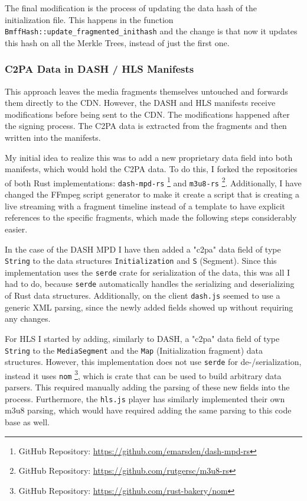 The final modification is the process of updating the data hash of the initialization file. This happens in the function \texttt{BmffHash::update\_fragmented\_inithash} and the change is that now it updates this hash on all the Merkle Trees, instead of just the first one.

\subsubsection{C2PA Data in DASH / HLS Manifests\label{sec:in_manifest}}

This approach leaves the media fragments themselves untouched and forwards them directly to the CDN. However, the DASH and HLS manifests receive modifications before being sent to the CDN. The modifications happened after the signing process. The C2PA data is extracted from the fragments and then written into the manifests.

My initial idea to realize this was to add a new proprietary data field into both manifests, which would hold the C2PA data. To do this, I forked the repositories of both Rust implementations: \texttt{dash-mpd-rs} \footnote{GitHub Repository: \url{https://github.com/emarsden/dash-mpd-rs}} and \texttt{m3u8-rs} \footnote{GitHub Repository: \url{https://github.com/rutgersc/m3u8-rs}}. Additionally, I have changed the FFmpeg script generator to make it create a script that is creating a live streaming with a fragment timeline instead of a template to have explicit references to the specific fragments, which made the following steps considerably easier.

In the case of the DASH MPD I have then added a "c2pa" data field of type \texttt{String} to the data structures \texttt{Initialization} and \texttt{S} (Segment). Since this implementation uses the \texttt{serde} crate for serialization of the data, this was all I had to do, because \texttt{serde} automatically handles the serializing and deserializing of Rust data structures. Additionally, on the client \texttt{dash.js} seemed to use a generic XML parsing, since the newly added fields showed up without requiring any changes.

For HLS I started by adding, similarly to DASH, a "c2pa" data field of type \texttt{String} to the \texttt{MediaSegment} and the \texttt{Map} (Initialization fragment) data structures. However, this implementation does not use \texttt{serde} for de-/serialization, instead it uses \texttt{nom} \footnote{GitHub Repository: \url{https://github.com/rust-bakery/nom}}, which is crate that can be used to build arbitrary data parsers. This required manually adding the parsing of these new fields into the process. Furthermore, the \texttt{hls.js} player has similarly implemented their own m3u8 parsing, which would have required adding the same parsing to this code base as well.

